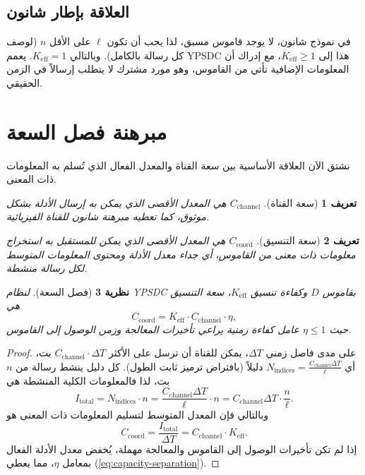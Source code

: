 \documentclass[12pt,a4paper]{article}
\newcommand{\Keff}{K_{\mathrm{eff}}}
\newtheorem{theorem}{نظرية}[section]
\newtheorem{definition}[theorem]{تعريف}
\theoremstyle{remark}
\begin{document}
	\subsection{العلاقة بإطار شانون}
	
	في نموذج شانون، لا يوجد قاموس مسبق، لذا يجب أن تكون \(\ell\) على الأقل \(n\) (لوصف كل رسالة بالكامل). وبالتالي \(\Keff = 1\). يعمم YPSDC هذا إلى \(\Keff \ge 1\)، مع إدراك أن المعلومات الإضافية تأتي من القاموس، وهو مورد مشترك لا يتطلب إرسالاً في الزمن الحقيقي.
	
	\section{مبرهنة فصل السعة}
	\label{sec:separation}
	
	نشتق الآن العلاقة الأساسية بين سعة القناة والمعدل الفعال الذي تُسلم به المعلومات ذات المعنى.
	
	\begin{definition}[سعة القناة]
		\(C_{\text{channel}}\) هي المعدل الأقصى الذي يمكن به إرسال الأدلة بشكل موثوق، كما تعطيه مبرهنة شانون للقناة الفيزيائية.
	\end{definition}
	
	\begin{definition}[سعة التنسيق]
		\(C_{\text{coord}}\) هي المعدل الأقصى الذي يمكن للمستقبل به استخراج معلومات ذات معنى من القاموس، أي جداء معدل الأدلة ومحتوى المعلومات المتوسط لكل رسالة منشطة.
	\end{definition}
	
	\begin{theorem}[فصل السعة]
		لنظام YPSDC بقاموس \(D\) وكفاءة تنسيق \(\Keff\)، سعة التنسيق هي
		\begin{equation}
			C_{\text{coord}} = \Keff \cdot C_{\text{channel}} \cdot \eta,
			\label{eq:capacity-separation}
		\end{equation}
		حيث \(\eta \le 1\) عامل كفاءة زمنية يراعي تأخيرات المعالجة وزمن الوصول إلى القاموس.
	\end{theorem}
	
	\begin{proof}
		على مدى فاصل زمني \(\Delta T\)، يمكن للقناة أن ترسل على الأكثر \(C_{\text{channel}} \cdot \Delta T\) بت، أي \(N_{\text{indices}} = \frac{C_{\text{channel}} \Delta T}{\ell}\) دليلاً (بافتراض ترميز ثابت الطول). كل دليل ينشط رسالة من \(n\) بت، لذا فالمعلومات الكلية المنشطة هي
		\[
		I_{\text{total}} = N_{\text{indices}} \cdot n = \frac{C_{\text{channel}} \Delta T}{\ell} \cdot n = C_{\text{channel}} \Delta T \cdot \frac{n}{\ell}.
		\]
		وبالتالي فإن المعدل المتوسط لتسليم المعلومات ذات المعنى هو
		\[
		C_{\text{coord}} = \frac{I_{\text{total}}}{\Delta T} = C_{\text{channel}} \cdot \Keff.
		\]
		إذا لم تكن تأخيرات الوصول إلى القاموس والمعالجة مهملة، يُخفض معدل الأدلة الفعال بمعامل \(\eta\)، مما يعطي (\ref{eq:capacity-separation}).
	\end{proof}
	
\end{document}
